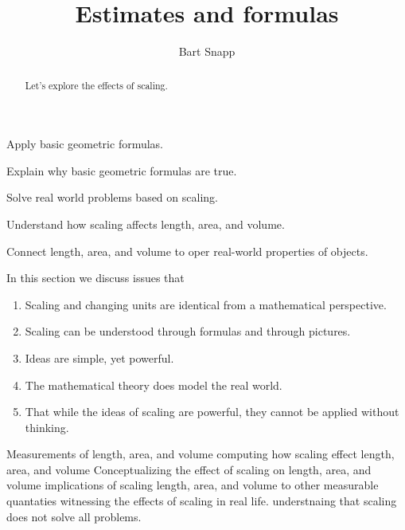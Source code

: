 \documentclass[handout,nooutcomes,noauthor]{ximera}
\title{Estimates and formulas}
\author{Bart Snapp}
\begin{document}
\begin{abstract}
  Let's explore the effects of scaling.
\end{abstract}
\maketitle


\begin{listSectionOutcomes}
\item Apply basic geometric formulas. 
\item Explain why basic geometric formulas are true.
\item Solve real world problems based on scaling.
\item Understand how scaling affects length, area, and
  volume.
\item  Connect length, area, and volume to oper real-world properties of objects.
\end{listSectionOutcomes}

In this section we discuss issues that

\begin{enumerate}
\item Scaling and changing units are identical from a mathematical
  perspective.
\item Scaling can be understood through formulas and through pictures.
\item Ideas are simple, yet powerful.
\item The mathematical theory does model the real world.
\item That while the ideas of scaling are powerful, they cannot be
  applied without thinking.
\end{enumerate}



Measurements of length, area, and volume
computing how  scaling effect length, area, and volume
Conceptualizing the effect of scaling on  length, area, and volume
implications of scaling  length, area, and volume to other measurable quantaties
witnessing the effects of scaling in real life.
understnaing that scaling does not solve all problems.
\end{document}

